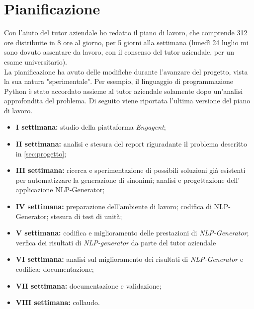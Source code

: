 \section{Pianificazione}
Con l'aiuto del tutor aziendale ho redatto il piano di lavoro, che comprende 312 ore distribuite in 8 ore al giorno, per 5 giorni alla settimana (lunedì 24 luglio mi sono dovuto assentare da lavoro, con il consenso del tutor aziendale, per un esame universitario).\\
La pianificazione ha avuto delle modifiche durante l'avanzare del progetto, vista la sua natura "sperimentale". Per esempio, il linguaggio di programmazione Python è stato accordato assieme al tutor aziendale solamente dopo un'analisi approfondita del problema.
Di seguito viene riportata l'ultima versione del piano di lavoro.
\begin{itemize}
    \item \textbf{I settimana:} studio della piattaforma \emph{Engagent};
    \item \textbf{II settimana:} analisi e stesura del report riguradante il problema descritto in \ref{sec:progetto};
    \item \textbf{III settimana:} ricerca e sperimentazione di possibili soluzioni già esistenti per automatizzare la generazione di sinonimi; analisi e progettazione dell' applicazione NLP-Generator;
    \item \textbf{IV settimana:} preparazione dell'ambiente di lavoro; codifica di NLP-Generator; stesura di test di unità;
    \item \textbf{V settimana:} codifica e miglioramento delle prestazioni di \emph{NLP-Generator}; verfica dei risultati di \emph{NLP-generator} da parte del tutor aziendale
    \item \textbf{VI settimana:} analisi sul miglioramento dei risultati di \emph{NLP-Generator} e codifica; documentazione;
    \item \textbf{VII settimana:} documentazione e validazione;
    \item \textbf{VIII settimana:} collaudo.
\end{itemize}
